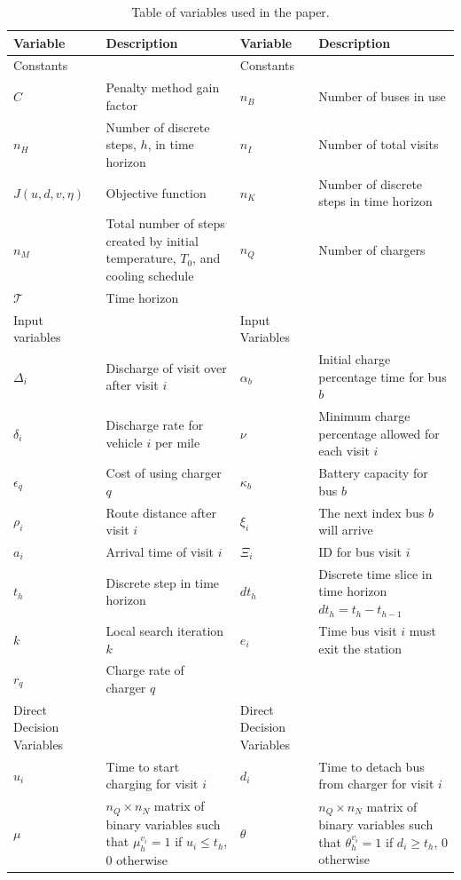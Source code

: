 \documentclass[11pt,a4paper,final]{article}
\newcommand{\T}{\mathcal{T}}                %
\newcommand{\Tau}{T}                        %
\begin{document}
\begin{table}[htbp]
\caption{\label{tab:variables}Table of variables used in the paper.}
\centering
\begin{tabularx}{\textwidth}{L{0.3} L{1.2} L{0.3} L{1.2}}
\textbf{Variable} & \textbf{Description} & \textbf{Variable} & \textbf{Description}\\[0pt]
\hline
Constants &  & Constants & \\[0pt]
\(C\) & Penalty method gain factor & \(n_B\) & Number of buses in use\\[0pt]
\(n_H\) & Number of discrete steps, \(h\), in time horizon & \(n_I\) & Number of total visits\\[0pt]
\(J(u,d,v,\eta)\) & Objective function & \(n_K\) & Number of discrete steps in time horizon\\[0pt]
\(n_M\) & Total number of steps created by initial temperature, \(\Tau_0\), and cooling schedule & \(n_Q\) & Number of chargers\\[0pt]
\(\T\) & Time horizon &  & \\[0pt]
\hline
Input variables &  & Input Variables & \\[0pt]
\(\Delta_i\) & Discharge of visit over after visit \(i\) & \(\alpha_b\) & Initial charge percentage time for bus \(b\)\\[0pt]
\(\delta_i\) & Discharge rate for vehicle \(i\) per mile & \(\nu\) & Minimum charge percentage allowed for each visit \(i\)\\[0pt]
\(\epsilon_q\) & Cost of using charger \(q\) & \(\kappa_b\) & Battery capacity for bus \(b\)\\[0pt]
\(\rho_i\) & Route distance after visit \(i\) & \(\xi_i\) & The next index bus \(b\) will arrive\\[0pt]
\(a_i\) & Arrival time of visit \(i\) & \(\Xi_i\) & ID for bus visit \(i\)\\[0pt]
\(t_h\) & Discrete step in time horizon & \(dt_h\) & Discrete time slice in time horizon \(dt_h = t_h - t_{h-1}\)\\[0pt]
\(k\) & Local search iteration \(k\) & \(e_i\) & Time bus visit \(i\) must exit the station\\[0pt]
\(r_q\) & Charge rate of charger \(q\) &  & \\[0pt]
\hline
Direct Decision Variables &  & Direct Decision Variables & \\[0pt]
\(u_i\) & Time to start charging for visit \(i\) & \(d_i\) & Time to detach bus from charger for visit \(i\)\\[0pt]
\(\mu\) & \(n_Q \times n_N\) matrix of binary variables such that \(\mu_h^{v_i} = 1\) if \(u_i \le t_h\), 0 otherwise & \(\theta\) & \(n_Q \times n_N\) matrix of binary variables such that \(\theta_h^{v_i} = 1\) if \(d_i \ge t_h\), 0 otherwise\\[0pt]

\end{tabularx}
\end{table}
\end{document}
